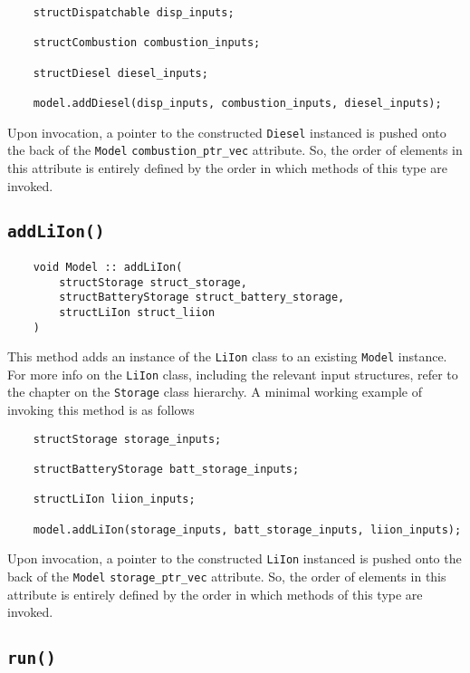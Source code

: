 \documentclass[12pt, letterpaper]{report}
\begin{document}
\begin{verbatim}
    structDispatchable disp_inputs;
    
    structCombustion combustion_inputs;
    
    structDiesel diesel_inputs;
    
    model.addDiesel(disp_inputs, combustion_inputs, diesel_inputs);
\end{verbatim}

\noindent Upon invocation, a pointer to the constructed \texttt{Diesel} instanced is pushed onto the back of the \texttt{Model} \texttt{combustion\_ptr\_vec} attribute. So, the order of elements in this attribute is entirely defined by the order in which methods of this type are invoked.

\subsection{\texttt{addLiIon(\;\;)}}

\begin{verbatim}
    void Model :: addLiIon(
        structStorage struct_storage,
        structBatteryStorage struct_battery_storage,
        structLiIon struct_liion
    )
\end{verbatim}

This method adds an instance of the \texttt{LiIon} class to an existing \texttt{Model} instance. For more info on the \texttt{LiIon} class, including the relevant input structures, refer to the chapter on the \texttt{Storage} class hierarchy. A minimal working example of invoking this method is as follows

\begin{verbatim}
    structStorage storage_inputs;
    
    structBatteryStorage batt_storage_inputs;
    
    structLiIon liion_inputs;
    
    model.addLiIon(storage_inputs, batt_storage_inputs, liion_inputs);
\end{verbatim}

\noindent Upon invocation, a pointer to the constructed \texttt{LiIon} instanced is pushed onto the back of the \texttt{Model} \texttt{storage\_ptr\_vec} attribute. So, the order of elements in this attribute is entirely defined by the order in which methods of this type are invoked.

\subsection{\texttt{run(\;\;)}}
\end{document}
